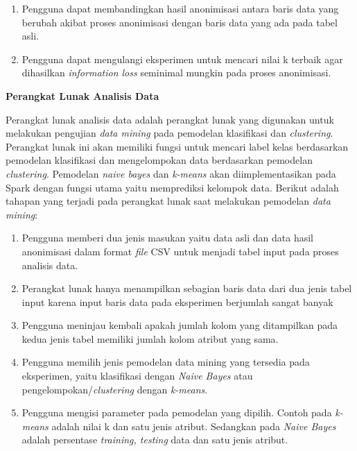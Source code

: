 \documentclass[a4paper,twoside]{article}
\begin{document}
\begin{enumerate}
\begin{enumerate}
\item Pengguna dapat membandingkan hasil anonimisasi antara baris data yang berubah akibat proses anonimisasi dengan baris data yang ada pada tabel asli.

\item Pengguna dapat mengulangi eksperimen untuk mencari nilai k terbaik agar dihasilkan \textit{information loss} seminimal mungkin pada proses anonimisasi.


 
\end{enumerate}

\textbf{Perangkat Lunak Analisis Data}

Perangkat lunak analisis data adalah perangkat lunak yang digunakan untuk melakukan pengujian \textit{data mining} pada pemodelan klasifikasi dan \textit{clustering}. Perangkat lunak ini akan memiliki fungsi untuk mencari label kelas berdasarkan pemodelan klasifikasi dan mengelompokan data berdasarkan pemodelan \textit{clustering}. Pemodelan \textit{naive bayes} dan \textit{k-means} akan diimplementasikan pada Spark dengan fungsi utama yaitu memprediksi kelompok data. Berikut adalah tahapan yang terjadi pada perangkat lunak saat melakukan pemodelan \textit{data mining}:

\begin{enumerate}

\item Pengguna memberi dua jenis masukan yaitu data asli dan data hasil anonimisasi dalam format \textit{file} CSV untuk menjadi tabel input pada proses analisis data.

\item Perangkat lunak hanya menampilkan sebagian baris data dari dua jenis tabel input karena input baris data pada eksperimen berjumlah sangat banyak 

\item Pengguna meninjau kembali apakah jumlah kolom yang ditampilkan pada kedua jenis tabel memiliki jumlah kolom atribut yang sama.

\item Pengguna memilih jenis pemodelan data mining yang tersedia pada eksperimen, yaitu klasifikasi dengan \textit{Naive Bayes} atau pengelompokan/\textit{clustering} dengan \textit{k-means}. 

\item Pengguna mengisi parameter pada pemodelan yang dipilih. Contoh pada \textit{k-means} adalah nilai k dan satu jenis atribut. Sedangkan pada \textit{Naive Bayes} adalah persentase \textit{training, testing} data dan satu jenis atribut.


\end{enumerate}
\end{enumerate}
\end{document}
